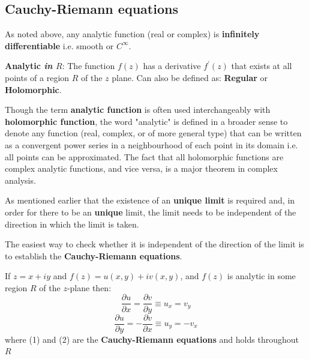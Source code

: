 \documentclass[10pt,a4paper]{article}
\begin{document}
\pagebreak
\subsection{Cauchy-Riemann equations}

As noted above, any analytic function (real or complex) is \textbf{infinitely differentiable} i.e.
smooth or $C^{\infty}$.

\begin{tcolorbox}[breakable,colback=white]
    \textbf{Analytic \textit{in $R$}}: The function $f(z)$ has a derivative $f^{\prime}(z)$ that exists at all points of
    a region $R$ of the $z$ plane. Can also be defined as: \textbf{Regular} or \textbf{Holomorphic}.
\end{tcolorbox}

Though the term \textbf{analytic function} is often used interchangeably with \textbf{holomorphic
function}, the word "analytic" is defined in a broader sense to denote any function (real, complex,
or of more general type) that can be written as a convergent power series in a neighbourhood of each
point in its domain i.e. all points can be approximated. The fact that all holomorphic functions are
complex analytic functions, and vice versa, is a major theorem in complex analysis.

As mentioned earlier that the existence of an \textbf{unique limit} is required and, in order for
there to be an \textbf{unique} limit, the limit needs to be independent of the direction in which the limit
is taken. \par

The easiest way to check whether it is independent of the direction of the limit is to establish the
\textbf{Cauchy-Riemann equations}. \par 

\begin{tcolorbox}[breakable,colback=white]
If $z=x+iy$ and $f(z)=u(x,y)+iv(x,y)$, and $f(z)$ is analytic in some region $R$ of the $z$-plane
then: 
\begin{equation}
    \frac{\partial u}{\partial x}=\frac{\partial v}{\partial y} \equiv u_x = v_y
\end{equation}
\begin{equation}
    \frac{\partial u}{\partial y}=-\frac{\partial v}{\partial x} \equiv u_y = -v_x
\end{equation}
where (1) and (2) are the \textbf{Cauchy-Riemann equations} and holds throughout $R$
\end{tcolorbox}
\end{document}
